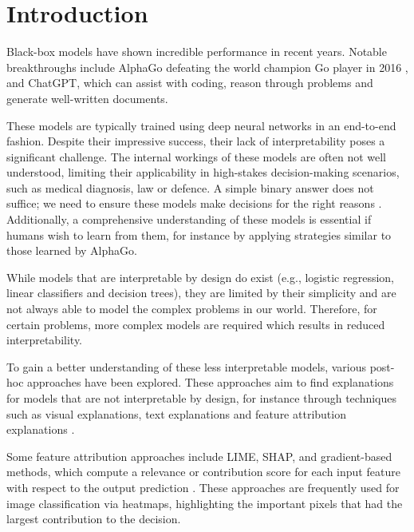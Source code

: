 \chapter{Introduction}

\setcounter{page}{1} %



Black-box models have shown incredible performance in recent years. Notable breakthroughs include AlphaGo defeating the world champion Go player in 2016 \citep{fuAlphaGoMonteCarlo2016}, and ChatGPT, which can assist with coding, reason through problems and generate well-written documents.

These models are typically trained using deep neural networks in an end-to-end fashion. Despite their impressive success, their lack of interpretability poses a significant challenge. The internal workings of these models are often not well understood, limiting their applicability in high-stakes decision-making scenarios, such as medical diagnosis, law or defence. A simple binary answer does not suffice; we need to ensure these models make decisions for the right reasons \citep{alammarExplainableAIGuide2021}. Additionally, a comprehensive understanding of these models is essential if humans wish to learn from them, for instance by applying strategies similar to those learned by AlphaGo.

While models that are interpretable by design do exist (e.g., logistic regression, linear classifiers and decision trees), they are limited by their simplicity and are not always able to model the complex problems in our world. Therefore, for certain problems, more complex models are required which results in reduced interpretability.

To gain a better understanding of these less interpretable models, various post-hoc approaches have been explored. These approaches aim to find explanations for models that are not interpretable by design, for instance through techniques such as visual explanations, text explanations and feature attribution explanations \citep{barredoarrietaExplainableArtificialIntelligence2020a}.

Some feature attribution approaches include LIME, SHAP, and gradient-based methods, which compute a relevance or contribution score for each input feature with respect to the output prediction \citep{simonyanDeepConvolutionalNetworks2014, ribeiroWhyShouldTrust2016, lundbergUnifiedApproachInterpreting2017, molnarInterpretableMachineLearning2022}. These approaches are frequently used for image classification via heatmaps, highlighting the important pixels that had the largest contribution to the decision.

